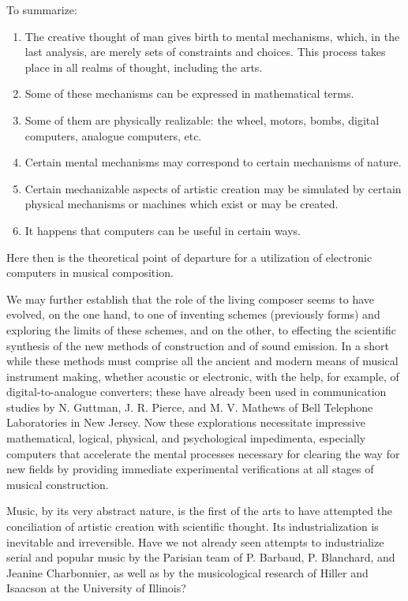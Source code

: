 \documentclass[letterpaper, 11pt]{article}
\begin{document}
To summarize:
\begin{enumerate}
    \item 
        The creative thought of man gives birth to mental mechanisms, which, in the last analysis, are merely sets of constraints and choices.
        This process takes place in all realms of thought, including the arts.
    \item
        Some of these mechanisms can be expressed in mathematical terms.
    \item
        Some of them are physically realizable: the wheel, motors, bombs, digital computers, analogue computers, etc.
    \item
        Certain mental mechanisms may correspond to certain mechanisms of nature.
    \item
        Certain mechanizable aspects of artistic creation may be simulated by certain physical mechanisms or machines which exist or may be created.
    \item
        It happens that computers can be useful in certain ways.
\end{enumerate}

Here then is the theoretical point of departure for a utilization of electronic computers in musical composition.

We may further establish that the role of the living composer seems to have evolved, on the one hand, to one of inventing schemes (previously forms) and exploring the limits of these schemes, and on the other, to effecting the scientific synthesis of the new methods of construction and of sound emission.
In a short while these methods must comprise all the ancient and modern means of musical instrument making, whether acoustic or electronic, with the help, for example, of digital-to-analogue converters; these have already been used in communication studies by N. Guttman, J. R. Pierce, and M. V. Mathews of Bell Telephone Laboratories in New Jersey.
Now these explorations necessitate impressive mathematical, logical, physical, and psychological impedimenta, especially computers that accelerate the mental processes necessary for clearing the way for new fields by providing immediate experimental verifications at all stages of musical construction.

Music, by its very abstract nature, is the first of the arts to have attempted the conciliation of artistic creation with scientific thought.
Its industrialization is inevitable and irreversible.
Have we not already seen attempts to industrialize serial and popular music by the Parisian team of P. Barbaud, P. Blanchard, and Jeanine Charbonnier, as well as by the musicological research of Hiller and Isaacson at the University of Illinois?
\end{document}
